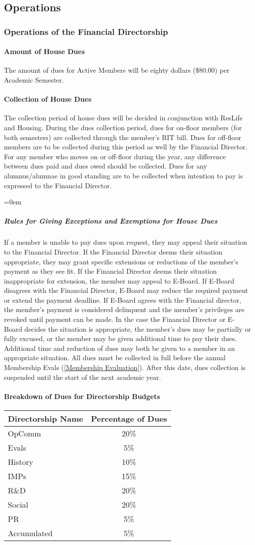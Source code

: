 \documentclass{article}
\newcommand{\asection}[1]{\subsection{#1} \label{#1}}
\newcommand{\asubsection}[1]{\subsubsection{#1} \label{#1}}
\newcommand{\asubsubsection}[1]{\paragraph{#1} \label{#1}}
\newcommand{\asubsubsubsection}[1]{\parindent=0em\subparagraph{#1} \label{#1}}
\begin{document}
\asection{Operations}

\asubsection{Operations of the Financial Directorship}

\asubsubsection{Amount of House Dues}
The amount of dues for Active Members will be eighty dollars (\$80.00) per Academic Semester.

\asubsubsection{Collection of House Dues}
The collection period of house dues will be decided in conjunction with ResLife and Housing.
During the dues collection period, dues for on-floor members (for both semesters) are collected through the member’s RIT bill.
Dues for off-floor members are to be collected during this period as well by the Financial Director.
For any member who moves on or off-floor during the year, any difference between dues paid and dues owed should be collected.
Dues for any alumnus/alumnae in good standing are to be collected when intention to pay is expressed to the Financial Director.

\asubsubsubsection{Rules for Giving Exceptions and Exemptions for House Dues}
If a member is unable to pay dues upon request, they may appeal their situation to the Financial Director.
If the Financial Director deems their situation appropriate, they may grant specific extensions or reductions of the member's payment as they see fit.
If the Financial Director deems their situation inappropriate for extension, the member may appeal to E-Board.
If E-Board disagrees with the Financial Director, E-Board may reduce the required payment or extend the payment deadline.
If E-Board agrees with the Financial director, the member’s payment is considered delinquent and the member’s privileges are revoked until payment can be made.
In the case the Financial Director or E-Board decides the situation is appropriate, the member's dues may be partially or fully excused, or the member may be given additional time to pay their dues. 
Additional time and reduction of dues may both be given to a member in an appropriate situation.
All dues must be collected in full before the annual Membership Evals (\ref{Membership Evaluation}).
After this date, dues collection is suspended until the start of the next academic year.

\asubsubsection{Breakdown of Dues for Directorship Budgets}
\begin{center}
\begin{tabular}[c]{|l c|}
\hline
Directorship Name & Percentage of Dues \\
\hline
\hline
OpComm & 20\% \\
\hline
Evals & 5\% \\
\hline
History & 10\% \\
\hline
IMPs & 15\% \\
\hline
R\&D & 20\% \\
\hline
Social & 20\% \\
\hline
PR & 5\% \\
\hline
Accumulated & 5\% \\
\hline
\end{tabular}
\end{center}
\end{document}
